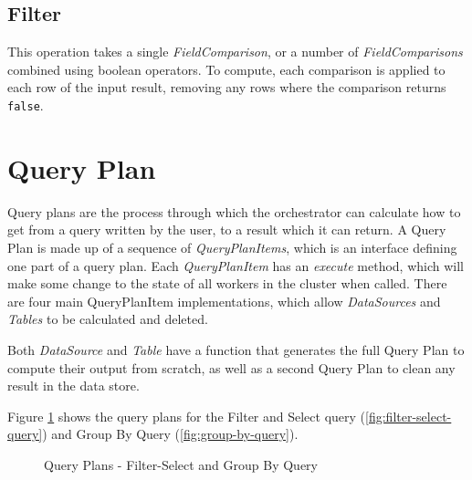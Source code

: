 \subsection{Filter}
This operation takes a single \textit{FieldComparison}, or a number of \textit{FieldComparisons} combined using boolean operators. To compute, each comparison is applied to each row of the input result, removing any rows where the comparison returns \texttt{false}.



\section{Query Plan}
Query plans are the process through which the orchestrator can calculate how to get from a query written by the user, to a result which it can return. A Query Plan is made up of a sequence of \textit{QueryPlanItems}, which is an interface defining one part of a query plan. Each \textit{QueryPlanItem} has an \textit{execute} method, which will make some change to the state of all workers in the cluster when called. There are four main QueryPlanItem implementations, which allow \textit{DataSources} and \textit{Tables} to be calculated and deleted.

Both \textit{DataSource} and \textit{Table} have a function that generates the full Query Plan to compute their output from scratch, as well as a second Query Plan to clean any result in the data store. 

Figure \ref{fig:filter-group-by-query-plan} shows the query plans for the Filter and Select query (\ref{fig:filter-select-query}) and Group By Query (\ref{fig:group-by-query}).

\begin{figure}
	\centering
	\qquad
	\caption{Query Plans - Filter-Select and Group By Query}%
	\label{fig:filter-group-by-query-plan}
\end{figure}

